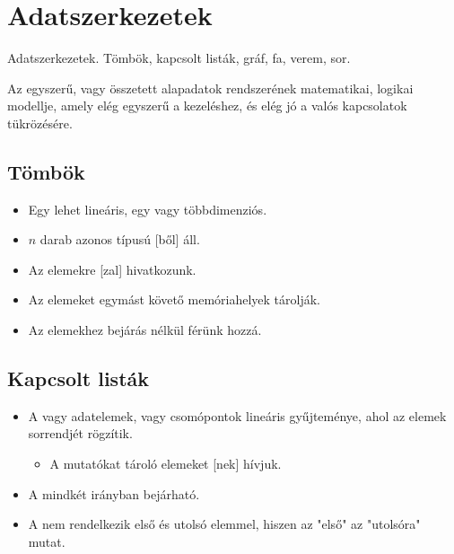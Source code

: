 \documentclass[../../main.tex]{subfiles}
\begin{document}
\section{Adatszerkezetek}

\begin{fulltheorem}
	Adatszerkezetek. Tömbök, kapcsolt listák, gráf, fa, verem, sor.
\end{fulltheorem}

Az  egyszerű, vagy összetett alapadatok rendszerének
matematikai, logikai modellje, amely elég egyszerű a kezeléshez, és elég jó
a valós kapcsolatok tükrözésére.

\subsection{Tömbök}

\begin{itemize}
	\item Egy  lehet lineáris, egy vagy többdimenziós.

	\item $n$ darab azonos típusú [ből] áll.

	\item Az elemekre [zal] hivatkozunk.

	\item Az elemeket egymást követő memóriahelyek tárolják.

	\item Az elemekhez bejárás nélkül férünk hozzá.
\end{itemize}

\subsection{Kapcsolt listák}

\begin{itemize}
	\item A  vagy 
	      adatelemek, vagy csomópontok lineáris gyűjteménye,
	      ahol az elemek sorrendjét  rögzítik.
	      \begin{itemize}
		      \item A mutatókat tároló elemeket  hívjuk.
	      \end{itemize}

	\item A  mindkét irányban bejárható.

	\item A  nem rendelkezik
	      első és utolsó elemmel, hiszen az "első" az "utolsóra" mutat.
\end{itemize}
\end{document}
